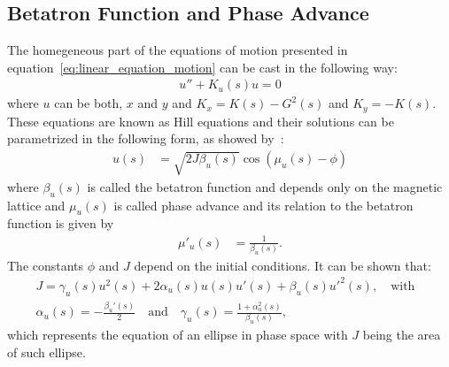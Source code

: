 \subsection{Betatron Function and Phase Advance} \label{ssub:betatron_function}

    The homegeneous part of the equations of motion presented in equation~\eqref{eq:linear_equation_motion} can be cast in the following way:
    \begin{align}
        u'' + K_u(s)u = 0
    \end{align}
    where $u$ can be both, $x$ and $y$ and $K_x=K(s)-G^2(s)$ and $K_y=-K(s)$. These equations are known as Hill equations and their solutions can be parametrized in the following form, as showed by~:
	\begin{align} \label{eq:betatron_motion}
		u(s) &= \sqrt{2J\beta_u(s)} \cos(\mu_u(s) - \phi)
	\end{align}
	where $\beta_u(s)$ is called the betatron function and depends only on the magnetic lattice and $\mu_u(s)$ is called phase advance and its relation to the betatron function is given by
	\begin{align}\label{eq:phase_advance}
		\mu'_u(s) &= \frac{1}{\beta_u(s)}.
	\end{align}
	The constants $\phi$ and $J$ depend on the initial conditions. It can be shown that:
	\begin{align} \label{eq:linear_invariant}
		J = \gamma_u(s)u^2(s) + 2\alpha_u(s)u(s)u'(s) + \beta_u(s)u'^2(s),
												\quad \text{with}& \\[3mm]
        \alpha_u(s) = -\frac{\beta_u'(s)}{2} \quad \text{and} \nonumber \quad
		\gamma_u(s) = \frac{1+\alpha_u^2(s)}{\beta_u(s)},
	\end{align}
	which represents the equation of an ellipse in phase space with $J$ being the area of such ellipse.


